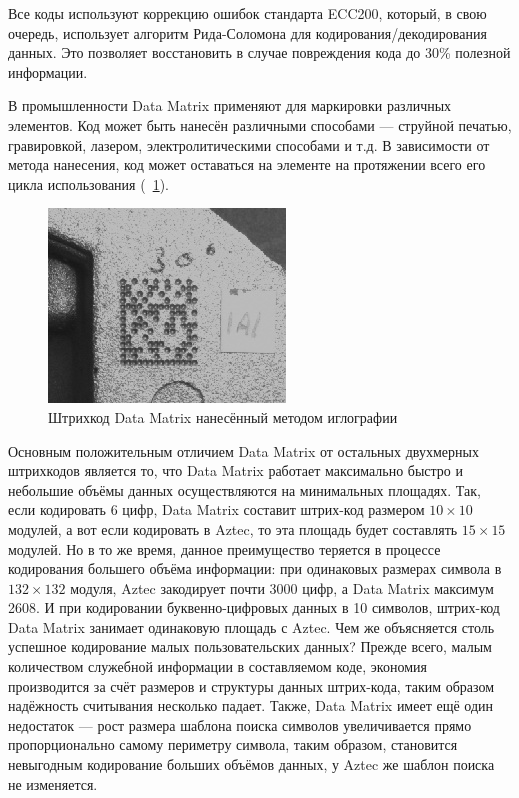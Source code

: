 Все коды используют коррекцию ошибок стандарта ECC200, 
который, в свою очередь, использует алгоритм Рида-Соломона для 
кодирования/декодирования данных. Это позволяет восстановить в случае 
повреждения кода до 30\% полезной информации.

В промышленности Data Matrix применяют для маркировки различных элементов. 
Код может быть нанесён различными способами --- струйной печатью, гравировкой, 
лазером, электролитическими способами и т.д. В зависимости от метода нанесения, 
код может оставаться на элементе на протяжении всего его цикла 
использования (\figurename\ \ref{fig:dmSample2}).

\begin{figure}[htb]
    \centering
    \includegraphics[scale=0.7]{img/dm_sample2}
    \caption{Штрихкод Data Matrix нанесённый методом иглографии}
    \label{fig:dmSample2}
\end{figure}

Основным положительным отличием Data Matrix от остальных двухмерных штрихкодов 
является то, что Data Matrix работает максимально быстро и небольшие объёмы 
данных осуществляются на минимальных площадях. Так, если кодировать 6 цифр, 
Data Matrix составит штрих-код размером $10 \times 10$ модулей, 
а вот если кодировать 
в Aztec, то эта площадь будет составлять $15 \times 15$ модулей. 
Но в то же время, 
данное преимущество теряется в процессе кодирования большего объёма информации: 
при одинаковых размерах символа в $132 \times 132$ модуля, Aztec закодирует  
почти 3000 
цифр, а Data Matrix максимум 2608. И при кодировании буквенно-цифровых данных 
в 10 символов, штрих-код Data Matrix занимает одинаковую площадь с Aztec. Чем 
же объясняется столь успешное кодирование малых пользовательских данных? Прежде 
всего, малым количеством служебной информации в составляемом коде, экономия 
производится за счёт размеров и структуры данных штрих-кода, таким образом 
надёжность считывания несколько падает. Также, Data Matrix имеет ещё один 
недостаток --- рост размера шаблона поиска символов увеличивается прямо 
пропорционально самому периметру символа, таким образом, становится невыгодным 
кодирование больших объёмов данных, у Aztec же шаблон поиска не изменяется.

